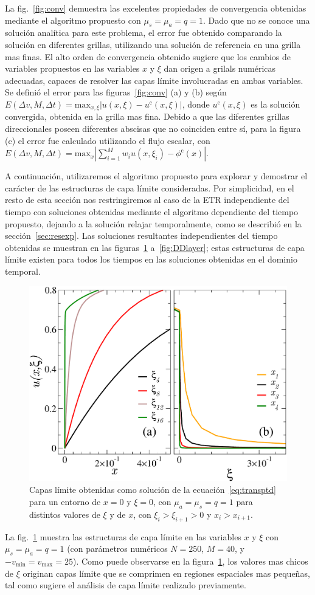 La fig.~\eqref{fig:conv} demuestra las excelentes propiedades de convergencia 
obtenidas mediante el algoritmo propuesto con $\mu_s=\mu_a=q=1$. Dado 
que no se conoce una solución analítica para este problema, 
el error fue obtenido comparando la solución en diferentes grillas, utilizando 
una solución de referencia en una grilla mas finas. El alto orden 
de convergencia obtenido sugiere que los cambios de variables 
propuestos en las variables $x$ y $\xi$ dan origen a grilals numéricas 
adecuadas, capaces de resolver las capas límite involucradas en ambas variables. 
Se definió el error para las figuras~\eqref{fig:conv} (a) y (b) según
  $E(\Delta v, M,\Delta t)=\text{max}_{x,\xi}
    |u(x,\xi)-u^{\text{c}}(x,\xi)|$, donde $u^{\text{c}}(x,\xi)$ 
    es la solución convergida, obtenida en la grilla mas fina. 
Debido a que las diferentes 
    grillas direccionales poseen diferentes abscisas que no coinciden 
    entre sí, para la figura (c) 
    el error fue calculado utilizando el flujo escalar, con  
$E(\Delta v, M,\Delta t)=\text{max}_x |\sum_{i=1}^M w_i u(x,\xi_i)-\phi^{\text{c}}(x)|$.

\pagebreak
\clearpage

A continuación, utilizaremos el algoritmo propuesto para 
explorar y demostrar el carácter de las estructuras de capa límite 
consideradas. Por simplicidad, en el resto de esta sección nos restringiremos 
al caso de la ETR independiente del tiempo con soluciones 
obtenidas mediante el algoritmo dependiente del tiempo propuesto, 
dejando a la solución relajar temporalmente, como se describió 
en la sección~\ref{sec:resexp}. Las soluciones resultantes independientes del 
tiempo obtenidas se muestran en las figuras~\ref{fig:blayers1} 
a~\ref{fig:DDlayer}; estas estructuras de capa límite 
existen para todos los tiempos en las soluciones obtenidas 
en el dominio temporal. 

\begin{figure}[h!]
\centering
  \includegraphics[width=0.5\linewidth]{figuras/xilay.pdf}
  \caption{Capas límite obtenidas como solución 
  de la ecuación~\eqref{eq:transptd} para un entorno de $x=0$ y $\xi=0$, 
  con $\mu_a=\mu_s=q=1$ para distintos valores de $\xi$ y de $x$, 
  con $\xi_i>\xi_{i+1}>0$ y $x_i>x_{i+1}$.}
 \label{fig:blayers1}
\end{figure}
La fig.~\ref{fig:blayers1} muestra las estructuras de capa límite en las 
variables $x$ y $\xi$ con $\mu_s=\mu_a=q=1$ (con parámetros numéricos $N=250$, $M=40$, 
y $-v_{\text{min}}=v_{\text{max}}=25$). Como puede observarse 
en la figura~\ref{fig:blayers1}, los valores mas chicos de $\xi$ 
originan capas límite que se comprimen en regiones espaciales mas 
pequeñas, tal como sugiere el análisis de capa límite realizado 
previamente. 

